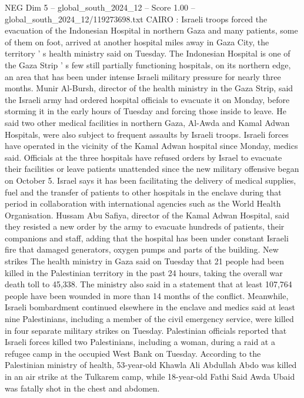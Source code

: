 \begin{textsample}{NEG Dim 5 – global\_south\_2024\_12 – Score 1.00 – global\_south\_2024\_12/119273698.txt}  \label{ex:f5_neg_402}
CAIRO : Israeli troops forced the evacuation of the Indonesian Hospital in northern Gaza and many patients, some of them on foot, arrived at another hospital miles away in Gaza City, the territory ' s health ministry said on Tuesday.
The Indonesian Hospital is one of the Gaza Strip ' s few still partially functioning hospitals, on its northern edge, an area that has been under intense Israeli military pressure for nearly three months.
Munir Al-Bursh, director of the health ministry in the Gaza Strip, said the Israeli army had ordered hospital officials to evacuate it on Monday, before storming it in the early hours of Tuesday and forcing those inside to leave.
He said two other medical facilities in northern Gaza, Al-Awda and Kamal Adwan Hospitals, were also subject to frequent assaults by Israeli troops.
Israeli forces have operated in the vicinity of the Kamal Adwan hospital since Monday, medics said.
Officials at the three hospitals have refused orders by Israel to evacuate their facilities or leave patients unattended since the new military offensive began on October 5.
Israel says it has been facilitating the delivery of medical supplies, fuel and the transfer of patients to other hospitals in the enclave during that period in collaboration with international agencies such as the World Health Organisation.
Hussam Abu Safiya, director of the Kamal Adwan Hospital, said they resisted a new order by the army to evacuate hundreds of patients, their companions and staff, adding that the hospital has been under constant Israeli fire that damaged generators, oxygen pumps and parts of the building.
New strikes The health ministry in Gaza said on Tuesday that 21 people had been killed in the Palestinian territory in the past 24 hours, taking the overall war death toll to 45,338.
The ministry also said in a statement that at least 107,764 people have been wounded in more than 14 months of the conflict.
Meanwhile, Israeli bombardment continued elsewhere in the enclave and medics said at least nine Palestinians, including a member of the civil emergency service, were killed in four separate military strikes on Tuesday.
Palestinian officials reported that Israeli forces killed two Palestinians, including a woman, during a raid at a refugee camp in the occupied West Bank on Tuesday.
According to the Palestinian ministry of health, 53-year-old Khawla Ali Abdullah Abdo was killed in an air strike at the Tulkarem camp, while 18-year-old Fathi Said Awda Ubaid was fatally shot in the chest and abdomen.

\end{textsample}
